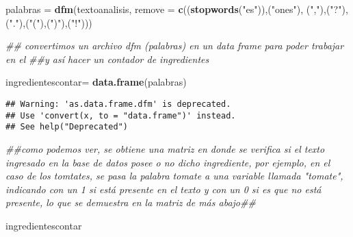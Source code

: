 \documentclass[
]{article}
\newenvironment{Shaded}{\begin{snugshade}}{\end{snugshade}}
\newcommand{\CommentTok}[1]{\textcolor[rgb]{0.56,0.35,0.01}{\textit{#1}}}
\newcommand{\DataTypeTok}[1]{\textcolor[rgb]{0.13,0.29,0.53}{#1}}
\newcommand{\KeywordTok}[1]{\textcolor[rgb]{0.13,0.29,0.53}{\textbf{#1}}}
\newcommand{\NormalTok}[1]{#1}
\newcommand{\StringTok}[1]{\textcolor[rgb]{0.31,0.60,0.02}{#1}}
\begin{document}
\begin{Shaded}
\begin{Highlighting}[]
\NormalTok{palabras =}\StringTok{ }\KeywordTok{dfm}\NormalTok{(textoanalisis, }\DataTypeTok{remove =} \KeywordTok{c}\NormalTok{((}\KeywordTok{stopwords}\NormalTok{(}\StringTok{"es"}\NormalTok{)),(}\StringTok{"ones"}\NormalTok{), (}\StringTok{","}\NormalTok{),(}\StringTok{"?"}\NormalTok{), (}\StringTok{"."}\NormalTok{),(}\StringTok{"("}\NormalTok{),(}\StringTok{")"}\NormalTok{),(}\StringTok{"!"}\NormalTok{)))}

\CommentTok{## convertimos un archivo dfm (palabras) en un data frame para poder trabajar en el }
\CommentTok{##y así hacer un contador de ingredientes}


\NormalTok{ingredientescontar=}\StringTok{ }\KeywordTok{data.frame}\NormalTok{(palabras)}
\end{Highlighting}
\end{Shaded}

\begin{verbatim}
## Warning: 'as.data.frame.dfm' is deprecated.
## Use 'convert(x, to = "data.frame")' instead.
## See help("Deprecated")
\end{verbatim}

\begin{Shaded}
\begin{Highlighting}[]
\CommentTok{##como podemos ver, se obtiene una matriz en donde se verifica si el texto ingresado en la base de datos  posee o no dicho ingrediente, por ejemplo, en el caso de los tomtates, se pasa la palabra tomate a una variable llamada "tomate", indicando con un 1 si está presente en el texto y con un 0 si es que no está presente, lo que se demuestra en la matriz de más abajo##}


\NormalTok{ingredientescontar}
\end{Highlighting}
\end{Shaded}
\end{document}
